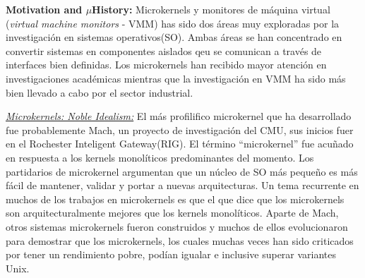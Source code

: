 \textbf{Motivation and $\mu$History:} Microkernels y monitores de máquina virtual (\emph{virtual machine monitors} - VMM) has sido dos áreas muy exploradas por la investigación en sistemas operativos(SO). Ambas áreas se han concentrado en convertir sistemas en componentes aislados qeu se comunican a través de interfaces bien definidas. Los microkernels han recibido mayor atención en investigaciones académicas mientras que la investigación en VMM ha sido más bien llevado a cabo por el sector industrial. 

\underline{\emph{Microkernels: Noble Idealism:}} El más profilifico microkernel que ha desarrollado fue probablemente Mach, un proyecto de investigación del CMU, sus inicios fuer en el Rochester Inteligent Gateway(RIG). El término ``microkernel'' fue acuñado en respuesta a los kernels monolíticos predominantes del momento. Los partidarios de microkernel argumentan que un núcleo de SO más pequeño es más fácil de mantener, validar y portar a nuevas arquitecturas. Un tema recurrente en muchos de los trabajos en microkernels es que el que dice que los microkernels son arquitecturalmente mejores que los kernels monolíticos.  Aparte de Mach, otros sistemas microkernels fueron construidos y muchos de ellos evolucionaron para demostrar que los microkernels, los cuales muchas veces han sido criticados por tener un rendimiento pobre, podían igualar e inclusive superar variantes Unix.

